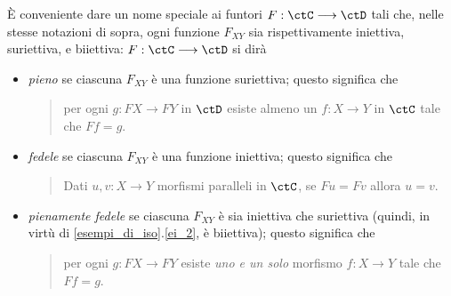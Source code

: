 \begin{definition}\label{classi_di_funtori}
	\`E conveniente dare un nome speciale ai funtori \(F : \ctC\fun\ctD\) tali che, nelle stesse notazioni di sopra, ogni funzione \(F_{XY}\) sia rispettivamente iniettiva, suriettiva, e biiettiva: \(F : \ctC\fun\ctD\) si dirà
	\begin{itemize}
		\item \emph{pieno} se ciascuna \(F_{XY}\) è una funzione suriettiva; questo significa che
		      \begin{quote}
			      per ogni \(g : FX\to FY\) in \(\ctD\) esiste almeno un \(f : X\to Y\) in \(\ctC\) tale che \(Ff=g\).
		      \end{quote}
		\item \emph{fedele} se ciascuna \(F_{XY}\) è una funzione iniettiva; questo significa che
		      \begin{quote}
			      Dati \(u,v : X\to Y\) morfismi paralleli in \(\ctC\), se \(Fu=Fv\) allora \(u=v\).
		      \end{quote}
		\item \emph{pienamente fedele} se ciascuna \(F_{XY}\) è sia iniettiva che suriettiva (quindi, in virtù di \ref{esempi_di_iso}.\ref{ei_2}, è biiettiva); questo significa che
		      \begin{quote}
			      per ogni \(g : FX\to FY\) esiste \emph{uno e un solo} morfismo \(f : X\to Y\) tale che \(Ff=g\).
		      \end{quote}
	\end{itemize}
\end{definition}
